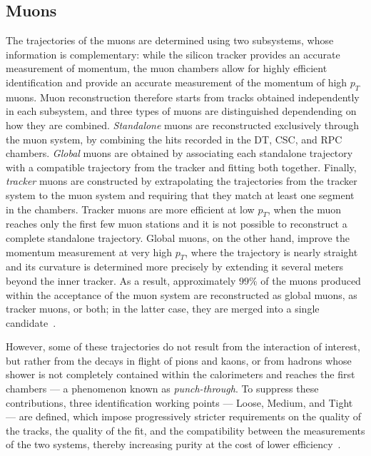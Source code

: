 \subsection{Muons}
\label{subsec:Muons}
%
The trajectories of the muons are determined using two subsystems, whose information is complementary: while the silicon tracker provides an accurate measurement of momentum, the muon chambers allow for highly efficient identification and provide an accurate measurement of the momentum of high $p_T$ muons. Muon reconstruction therefore starts from tracks obtained independently in each subsystem, and three types of muons are distinguished dependending on how they are combined. \textit{Standalone} muons are reconstructed exclusively through the muon system, by combining the hits recorded in the DT, CSC, and RPC chambers. \textit{Global} muons are obtained by associating each standalone trajectory with a compatible trajectory from the tracker and fitting both together. Finally, \textit{tracker} muons are constructed by extrapolating the trajectories from the tracker system to the muon system and requiring that they match at least one segment in the chambers. Tracker muons are more efficient at low $p_T$, when the muon reaches only the first few muon stations and it is not possible to reconstruct a complete standalone trajectory. Global muons, on the other hand, improve the momentum measurement at very high $p_T$, where the trajectory is nearly straight and its curvature is determined more precisely by extending it several meters beyond the inner tracker. As a result, approximately $99\%$ of the muons produced within the acceptance of the muon system are reconstructed as global muons, as tracker muons, or both; in the latter case, they are merged into a single candidate~\cite{CMS:2018rym}.

However, some of these trajectories do not result from the interaction of interest, but rather from the decays in flight of pions and kaons, or from hadrons whose shower is not completely contained within the calorimeters and reaches the first chambers — a phenomenon known as \textit{punch-through}. To suppress these contributions, three identification working points — Loose, Medium, and Tight — are defined, which impose progressively stricter requirements on the quality of the tracks, the quality of the fit, and the compatibility between the measurements of the two systems, thereby increasing purity at the cost of lower efficiency~\cite{CMS:2018rym}.

